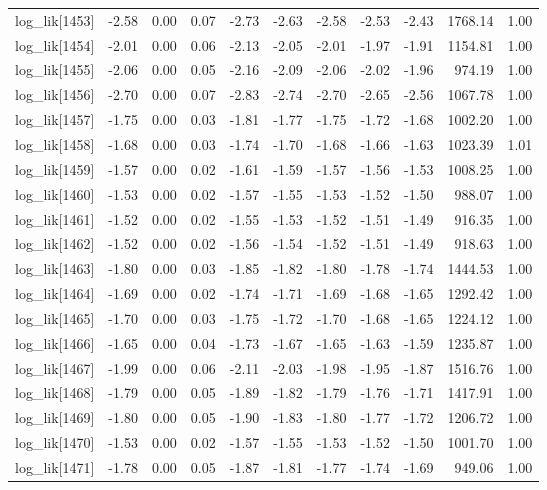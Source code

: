 \begin{table}[ht]
\begin{tabular}{rrrrrrrrrrr}
  log\_lik[1453] & -2.58 & 0.00 & 0.07 & -2.73 & -2.63 & -2.58 & -2.53 & -2.43 & 1768.14 & 1.00 \\ 
  log\_lik[1454] & -2.01 & 0.00 & 0.06 & -2.13 & -2.05 & -2.01 & -1.97 & -1.91 & 1154.81 & 1.00 \\ 
  log\_lik[1455] & -2.06 & 0.00 & 0.05 & -2.16 & -2.09 & -2.06 & -2.02 & -1.96 & 974.19 & 1.00 \\ 
  log\_lik[1456] & -2.70 & 0.00 & 0.07 & -2.83 & -2.74 & -2.70 & -2.65 & -2.56 & 1067.78 & 1.00 \\ 
  log\_lik[1457] & -1.75 & 0.00 & 0.03 & -1.81 & -1.77 & -1.75 & -1.72 & -1.68 & 1002.20 & 1.00 \\ 
  log\_lik[1458] & -1.68 & 0.00 & 0.03 & -1.74 & -1.70 & -1.68 & -1.66 & -1.63 & 1023.39 & 1.01 \\ 
  log\_lik[1459] & -1.57 & 0.00 & 0.02 & -1.61 & -1.59 & -1.57 & -1.56 & -1.53 & 1008.25 & 1.00 \\ 
  log\_lik[1460] & -1.53 & 0.00 & 0.02 & -1.57 & -1.55 & -1.53 & -1.52 & -1.50 & 988.07 & 1.00 \\ 
  log\_lik[1461] & -1.52 & 0.00 & 0.02 & -1.55 & -1.53 & -1.52 & -1.51 & -1.49 & 916.35 & 1.00 \\ 
  log\_lik[1462] & -1.52 & 0.00 & 0.02 & -1.56 & -1.54 & -1.52 & -1.51 & -1.49 & 918.63 & 1.00 \\ 
  log\_lik[1463] & -1.80 & 0.00 & 0.03 & -1.85 & -1.82 & -1.80 & -1.78 & -1.74 & 1444.53 & 1.00 \\ 
  log\_lik[1464] & -1.69 & 0.00 & 0.02 & -1.74 & -1.71 & -1.69 & -1.68 & -1.65 & 1292.42 & 1.00 \\ 
  log\_lik[1465] & -1.70 & 0.00 & 0.03 & -1.75 & -1.72 & -1.70 & -1.68 & -1.65 & 1224.12 & 1.00 \\ 
  log\_lik[1466] & -1.65 & 0.00 & 0.04 & -1.73 & -1.67 & -1.65 & -1.63 & -1.59 & 1235.87 & 1.00 \\ 
  log\_lik[1467] & -1.99 & 0.00 & 0.06 & -2.11 & -2.03 & -1.98 & -1.95 & -1.87 & 1516.76 & 1.00 \\ 
  log\_lik[1468] & -1.79 & 0.00 & 0.05 & -1.89 & -1.82 & -1.79 & -1.76 & -1.71 & 1417.91 & 1.00 \\ 
  log\_lik[1469] & -1.80 & 0.00 & 0.05 & -1.90 & -1.83 & -1.80 & -1.77 & -1.72 & 1206.72 & 1.00 \\ 
  log\_lik[1470] & -1.53 & 0.00 & 0.02 & -1.57 & -1.55 & -1.53 & -1.52 & -1.50 & 1001.70 & 1.00 \\ 
  log\_lik[1471] & -1.78 & 0.00 & 0.05 & -1.87 & -1.81 & -1.77 & -1.74 & -1.69 & 949.06 & 1.00 \\ 

\end{tabular}
\end{table}
